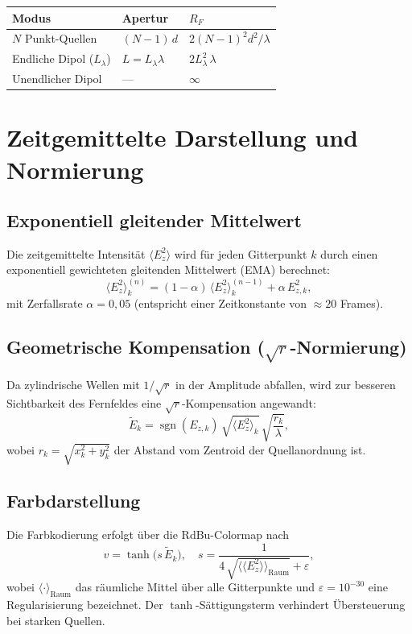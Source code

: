 \documentclass[11pt,a4paper]{article}
\begin{document}
\begin{center}
\begin{tabular}{lll}
\toprule
Modus & Apertur & $R_F$ \\
\midrule
$N$ Punkt-Quellen & $(N-1)\,d$ & $2(N-1)^2 d^2 / \lambda$ \\
Endliche Dipol ($L_\lambda$) & $L = L_\lambda\lambda$ & $2 L_\lambda^2\,\lambda$ \\
Unendlicher Dipol & --- & $\infty$ \\
\bottomrule
\end{tabular}
\end{center}

\section{Zeitgemittelte Darstellung und Normierung}

\subsection{Exponentiell gleitender Mittelwert}

Die zeitgemittelte Intensität $\langle E_z^2\rangle$ wird für jeden
Gitterpunkt $k$ durch einen exponentiell gewichteten gleitenden Mittelwert
(EMA) berechnet:
\[
  \langle E_z^2\rangle_k^{(n)} =
    (1 - \alpha)\,\langle E_z^2\rangle_k^{(n-1)} + \alpha\,E_{z,k}^2,
\]
mit Zerfallsrate $\alpha = 0{,}05$ (entspricht einer Zeitkonstante von
$\approx 20$ Frames).

\subsection{Geometrische Kompensation ($\sqrt{r}$-Normierung)}

Da zylindrische Wellen mit $1/\sqrt{r}$ in der Amplitude abfallen, wird zur
besseren Sichtbarkeit des Fernfeldes eine $\sqrt{r}$-Kompensation angewandt:
\[
  \tilde{E}_k = \operatorname{sgn}(E_{z,k})\,\sqrt{\langle E_z^2\rangle_k}\,
                \sqrt{\frac{r_k}{\lambda}},
\]
wobei $r_k = \sqrt{x_k^2 + y_k^2}$ der Abstand vom Zentroid der Quellanordnung ist.

\subsection{Farbdarstellung}

Die Farbkodierung erfolgt über die RdBu-Colormap nach
\[
  v = \tanh\!\bigl(s\,\tilde{E}_k\bigr), \quad
  s = \frac{1}{4\,\sqrt{\langle\langle E_z^2\rangle\rangle_{\text{Raum}}} + \varepsilon},
\]
wobei $\langle\cdot\rangle_{\text{Raum}}$ das räumliche Mittel über alle
Gitterpunkte und $\varepsilon = 10^{-30}$ eine Regularisierung bezeichnet.
Der $\tanh$-Sättigungsterm verhindert Übersteuerung bei starken Quellen.
\end{document}
